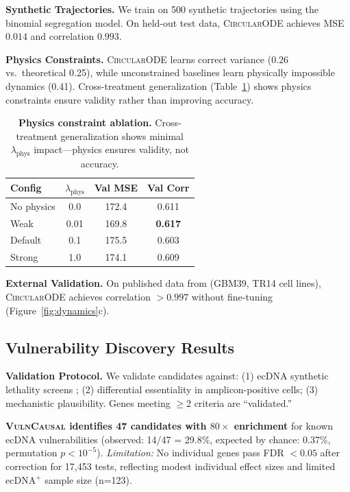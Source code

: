 \documentclass{article}
\newcommand{\circularode}{\textsc{CircularODE}}
\newcommand{\vulncausal}{\textsc{VulnCausal}}
\begin{document}
\textbf{Synthetic Trajectories.} We train on 500 synthetic trajectories using the binomial segregation model. On held-out test data, \circularode{} achieves MSE $0.014$ and correlation $0.993$.

\textbf{Physics Constraints.} \circularode{} learns correct variance (0.26 vs.\ theoretical 0.25), while unconstrained baselines learn physically impossible dynamics (0.41). Cross-treatment generalization (Table~\ref{tab:physics_ablation}) shows physics constraints ensure validity rather than improving accuracy.

\begin{table}[h]
\caption{\textbf{Physics constraint ablation.} Cross-treatment generalization shows minimal $\lambda_{\text{phys}}$ impact---physics ensures validity, not accuracy.}
\label{tab:physics_ablation}
\centering
\small
\begin{tabular}{@{}lccc@{}}
\toprule
Config & $\lambda_{\text{phys}}$ & Val MSE & Val Corr \\
\midrule
No physics & 0.0 & 172.4 & 0.611 \\
Weak & 0.01 & 169.8 & \textbf{0.617} \\
Default & 0.1 & 175.5 & 0.603 \\
Strong & 1.0 & 174.1 & 0.609 \\
\bottomrule
\end{tabular}
\end{table}

\textbf{External Validation.} On published data from \citet{lange_2022_mathematical} (GBM39, TR14 cell lines), \circularode{} achieves correlation $>0.997$ without fine-tuning (Figure~\ref{fig:dynamics}c).

\subsection{Vulnerability Discovery Results}

\textbf{Validation Protocol.} We validate candidates against: (1) ecDNA synthetic lethality screens \citep{yi_2024_chk1_ecdna}; (2) differential essentiality in amplicon-positive cells; (3) mechanistic plausibility. Genes meeting $\geq$2 criteria are ``validated.''

\textbf{\vulncausal{} identifies 47 candidates with $80\times$ enrichment} for known ecDNA vulnerabilities (observed: 14/47 = 29.8\%, expected by chance: 0.37\%, permutation $p < 10^{-5}$). \textit{Limitation:} No individual genes pass FDR $< 0.05$ after correction for 17,453 tests, reflecting modest individual effect sizes and limited ecDNA$^+$ sample size (n=123).
\end{document}
